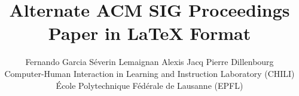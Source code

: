 \documentclass{sig-alternate}
\begin{document}
%

\title{Alternate {\ttlit ACM} SIG Proceedings Paper in LaTeX
Format}
\author{Fernando Garcia \qquad Séverin Lemaignan \qquad Alexis Jacq \qquad Pierre Dillenbourg\\Computer-Human Interaction in Learning and Instruction Laboratory (CHILI)\\École Polytechnique Fédérale de Lausanne (EPFL)}

%
%
%
%
%
\end{document}
